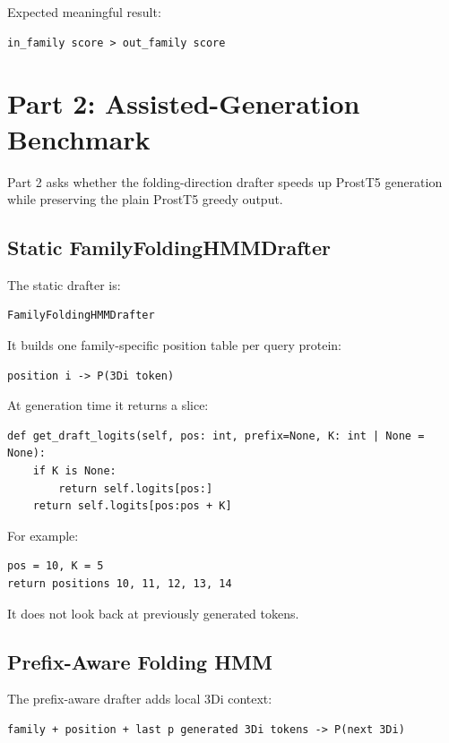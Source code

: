 \documentclass[11pt,a4paper]{article}
\begin{document}
Expected meaningful result:

\begin{verbatim}
in_family score > out_family score
\end{verbatim}

\section{Part 2: Assisted-Generation Benchmark}

Part 2 asks whether the folding-direction drafter speeds up ProstT5 generation while preserving the plain ProstT5 greedy output.

\subsection{Static FamilyFoldingHMMDrafter}

The static drafter is:

\begin{verbatim}
FamilyFoldingHMMDrafter
\end{verbatim}

It builds one family-specific position table per query protein:

\begin{verbatim}
position i -> P(3Di token)
\end{verbatim}

At generation time it returns a slice:

\begin{verbatim}
def get_draft_logits(self, pos: int, prefix=None, K: int | None = None):
    if K is None:
        return self.logits[pos:]
    return self.logits[pos:pos + K]
\end{verbatim}

For example:

\begin{verbatim}
pos = 10, K = 5
return positions 10, 11, 12, 13, 14
\end{verbatim}

It does not look back at previously generated tokens.

\subsection{Prefix-Aware Folding HMM}

The prefix-aware drafter adds local 3Di context:

\begin{verbatim}
family + position + last p generated 3Di tokens -> P(next 3Di)
\end{verbatim}
\end{document}
